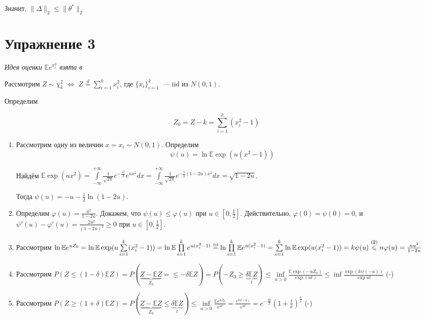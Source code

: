 \documentclass[a4paper]{article}
\newcommand{\E}{\mathbb{E}}
\begin{document}
Значит, $\|\Delta\|_2\leqslant \|\theta^*\|_2$
\section*{Упражнение 3}
{\em Идея оценки $\E e^{x_i^2}$ взята в \cite{massart}}

Рассмотрим $Z\sim\chi^2_k$ $\Leftrightarrow$ $Z\overset{d}{=}\sum\limits_{i=1}^k x_i^2$, где $\{x_i\}_{i=1}^k$~--- iid из $N(0,1)$.

Определим

$$Z_0=Z-k=\sum\limits_{i=1}^k(x_i^2-1)$$

\begin{enumerate}
	\item Рассмотрим одну из величин $x=x_i\sim N(0,1)$. Определим
$$
\psi(u)=\ln\E\exp(u(x^2-1))
$$

Найдём $\E \exp(ux^2)=\int\limits_{-\infty}^{+\infty}\frac{1}{\sqrt{2\pi}}e^{-\frac{x^2}{2}}e^{ux^2}dx=\int\limits_{-\infty}^{+\infty}\frac{1}{\sqrt{2\pi}}e^{-\frac{1}{2}(1-2u)x^2}dx=\sqrt{1-2u}$.

Тогда $\psi(u)=-u-\frac{1}{2}\ln(1-2u)$.

\item Определим $\varphi(u)=\frac{u^2}{1-2u}$. Докажем, что $\psi(u)\leqslant \varphi(u)$ при $u\in[0,\frac{1}{2}]$. Действительно, $\varphi(0)=\psi(0)=0$, и $\psi'(u)-\varphi'(u)=\frac{2u^2}{(1-2u)^2}\geqslant 0$ при $u\in[0,\frac{1}{2}]$.
\item Рассмотрим $\ln \E e^{uZ_0}=\ln\E \exp(u\sum\limits_{i=1}^k(x_i^2-1))=\ln\E\prod\limits_{i=1}^ke^{u(x_i^2-1)}\overset{\mbox{\tiny iid}}{=}\ln\prod\limits_{i=1}^k\E e^{u(x_i^2-1)}=\sum\limits_{i=1}^k\ln\E\exp(u(x_i^2-1))=k\psi(u)\overset{(2)}{\leqslant}n\varphi(u)=\frac{nu^2}{1-2u}$
\item Рассмотрим $P(Z\leqslant (1-\delta)\E Z)=P(\underbrace{Z-\E Z}_{Z_0}=\leqslant -\delta\E Z)=P(-Z_0\geqslant \underbrace{\delta \E Z}_t)\leqslant\inf\limits_{u>0}\frac{\E \exp(-uZ_0)}{\exp(ut)}\leqslant\inf \frac{\exp(k\psi(-u))}{\exp{ut}}$ (-)
\item Рассмотрим $P(Z\geqslant (1+\delta)\E Z)=P(\underbrace{Z-\E Z}_{Z_0}\leqslant \underbrace{\delta \E Z}_{t})\leqslant \inf\limits_{u>0}\frac{\E e^{uZ_0}}{e^{ut}}=\frac{e^{k\psi(u)}}{e^{ut}}=e^{-\frac{\delta k}{2}}(1+\frac{t}{k})^{\frac{k}{2}}$ (-)
\end{enumerate}
\end{document}
